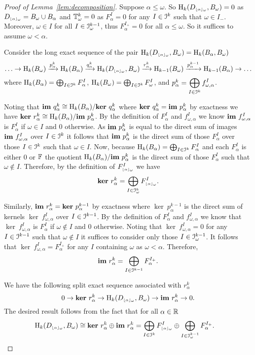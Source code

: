 \begin{proof}[Proof of Lemma~\ref{lem:decomposition}]
  Suppose $\alpha\leq\omega$.
  So $\mathrm{H}_k(D_{\scriptscriptstyle \lfloor\alpha\rfloor_{\omega}}, B_\omega) = 0$ as $D_{\scriptscriptstyle \lfloor\alpha\rfloor_{\omega}} = B_\omega\cup B_\alpha$ and $\mathbb{T}^k_\omega = 0$ as $F_\alpha^I = 0$ for any $I\in \mathcal{I}^k$ such that $\omega\in I_-$.
  Moreover, $\omega\in I$ for all $I\in \mathcal{I}_\omega^{k-1}$, thus $F_\alpha^{I_+} = 0$ for all $\alpha\leq\omega$.
  So it suffices to assume $\omega < \alpha$.

  Consider the long exact sequence of the pair $\mathrm{H}_k(D_{\scriptscriptstyle \lfloor\alpha\rfloor_{\omega}}, B_\omega) = \mathrm{H}_k(B_\alpha, B_\omega)$
  \[ \ldots\to \mathrm{H}_k(B_\omega)\xrightarrow{p_\alpha^k} \mathrm{H}_k(B_\alpha)\xrightarrow{q_\alpha^k}\mathrm{H}_k(D_{\scriptscriptstyle \lfloor\alpha\rfloor_{\omega}}, B_\omega)\xrightarrow{r_\alpha^k} \mathrm{H}_{k-1}(B_\omega)\xrightarrow{p_\alpha^{k-1}}\mathrm{H}_{k-1}(B_\alpha)\to\ldots\]
  where $\mathrm{H}_k(B_\alpha) = \bigoplus_{I\in \mathcal{I}^k}F_\alpha^I$, $\mathrm{H}_k(B_\omega) = \bigoplus_{I\in \mathcal{I}^k}F_\omega^I$, and $p_\alpha^k = \displaystyle\bigoplus_{I\in\mathcal{I}^k} f_{\omega,\alpha}^I$.

  Noting that $\mathbf{im}~q_\alpha^k \cong \mathrm{H}_k(B_\alpha) / \mathbf{ker}~q_\alpha^k$ where $\mathbf{ker}~q_\alpha^k = \mathbf{im}~p_\alpha^k$ by exactness we have $\mathbf{ker}~r_\alpha^k \cong \mathrm{H}_k(B_\alpha) / \mathbf{im}~p_\alpha^k$.
  By the definition of $F_\alpha^I$ and $f_{\omega,\alpha}^I$ we know $\mathbf{im}~f_{\omega,\alpha}^I$ is $F_\alpha^I$ if $\omega\in I$ and 0 otherwise.
  As $\mathbf{im}~p_\alpha^k$ is equal to the direct sum of images $\mathbf{im}~f_{\omega,\alpha}^I$ over $I\in\mathcal{I}^k$ it follows that $\mathbf{im}~p_\alpha^k$ is the direct sum of those $F_\alpha^I$ over those $I\in\mathcal{I}^k$ such that $\omega\in I$.
  Now, because $\mathrm{H}_k(B_\alpha) = \bigoplus_{I\in \mathcal{I}^k}F_\alpha^I$ and each $F_\alpha^I$ is either 0 or $\mathbb{F}$ the quotient $\mathrm{H}_k(B_\alpha) / \mathbf{im}~p_\alpha^k$ is the direct sum of those $F_\alpha^I$ such that $\omega\notin I$.
  Therefore, by the definition of $F_{\scriptscriptstyle \lfloor\alpha\rfloor_{\omega}}^I$ we have
  \[ \mathbf{ker}~r_\alpha^k = \bigoplus_{I\in\mathcal{I}_\omega^k} F_{\scriptscriptstyle \lfloor\alpha\rfloor_{\omega}}^I.\]

  Similarly, $\mathbf{im}~r_\alpha^k = \mathbf{ker}~p_\alpha^{k-1}$ by exactness where $\ker~p_\alpha^{k-1}$ is the direct sum of kernels $\ker~f_{\omega,\alpha}^I$ over $I\in\mathcal{I}^{k-1}$.
  By the definition of $F_\alpha^I$ and $f_{\omega,\alpha}^I$ we know that $\ker~f_{\omega,\alpha}^I$ is $F_\alpha^I$ if $\omega\notin I$ and $0$ otherwise.
  Noting that $\ker~f_{\omega,\alpha}^I = 0$ for any $I\in \mathcal{I}^{k-1}$ such that $\omega\notin I$ it suffices to consider only those $I\in \mathcal{I}_\omega^{k-1}$.
  It follows that $\ker~f_{\omega,\alpha}^I = F_\alpha^{I_+}$ for any $I$ containing $\omega$ as $\omega < \alpha$.
  Therefore,
  \[\mathbf{im}~r_\alpha^k = \bigoplus_{I\in\mathcal{I}^{k-1}} F_\alpha^{I_+}.\]

  We have the following split exact sequence associated with $r_\alpha^k$
  \[ 0\to \mathbf{ker}~r_\alpha^k\to \mathrm{H}_k(D_{\scriptscriptstyle \lfloor\alpha\rfloor_{\omega}}, B_\omega)\to\mathbf{im}~r_\alpha^k\to 0.\]
  The desired result follows from the fact that for all $\alpha\in\mathbb{R}$
  \begin{align*}
    \mathrm{H}_k(D_{\scriptscriptstyle \lfloor\alpha\rfloor_{\omega}}, B_\omega) &\cong \mathbf{ker}~r_\alpha^k\oplus \mathbf{im}~r_\alpha^k =\bigoplus_{I\in\mathcal{I}^k} F_{\scriptscriptstyle \lfloor\alpha\rfloor_{\omega}}^I\oplus \bigoplus_{I\in\mathcal{I}_\omega^{k-1}} F_\alpha^{I_+}.
  \end{align*}
\end{proof}
